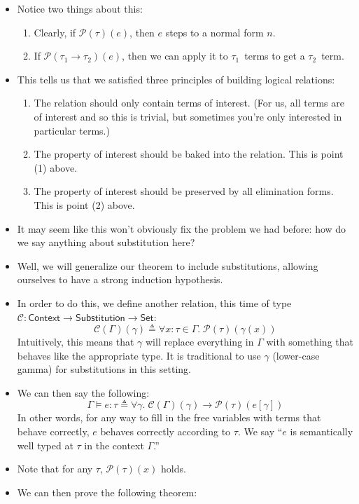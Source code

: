 \documentclass{lecturenotes}
\begin{document}
\begin{itemize}
\item Notice two things about this:
  \begin{enumerate}
  \item Clearly, if $\mathcal{P}(\tau)(e)$, then $e$ steps to a normal form $n$.
  \item If $\mathcal{P}(\tau_1 \to \tau_2)(e)$, then we can apply it to $\tau_1$~terms to get a $\tau_2$~term.
  \end{enumerate}
\item This tells us that we satisfied three principles of building logical relations:
  \begin{enumerate}
  \item The relation should only contain terms of interest.
    (For us, all terms are of interest and so this is trivial, but sometimes you're only interested in particular terms.)
  \item The property of interest should be baked into the relation.
    This is point (1) above.
  \item The property of interest should be preserved by all elimination forms.
    This is point (2) above.
  \end{enumerate}
\item It may seem like this won't obviously fix the problem we had before: how do we say anything about substitution here?
\item Well, we will generalize our theorem to include substitutions, allowing ourselves to have a strong induction hypothesis.
\item In order to do this, we define another relation, this time of type $\mathcal{C} : \textsf{Context} \to \textsf{Substitution} \to \textsf{Set}$:
  $$
  \mathcal{C}(\Gamma)(\gamma) \triangleq \forall x : \tau \in \Gamma.\; \mathcal{P}(\tau)(\gamma(x))
  $$
  Intuitively, this means that $\gamma$ will replace everything in $\Gamma$ with something that behaves like the appropriate type.
  It is traditional to use $\gamma$ (lower-case gamma) for substitutions in this setting.
\item We can then say the following:
  $$\Gamma \vDash e : \tau \triangleq \forall \gamma.\; \mathcal{C}(\Gamma)(\gamma) \to \mathcal{P}(\tau)(e[\gamma])$$
  In other words, for any way to fill in the free variables with terms that behave correctly, $e$ behaves correctly according to $\tau$.
  We say ``$e$ is semantically well typed at $\tau$ in the context $\Gamma$.''
\item Note that for any $\tau$, $\mathcal{P}(\tau)(x)$ holds.
\item We can then prove the following theorem:
\end{itemize}
\end{document}
